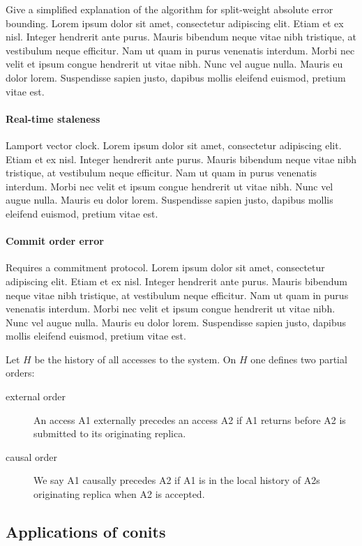 Give a simplified explanation of the algorithm for split-weight
absolute error bounding. Lorem ipsum dolor sit amet, consectetur
adipiscing elit. Etiam et ex nisl. Integer hendrerit ante
purus. Mauris bibendum neque vitae nibh tristique, at vestibulum neque
efficitur. Nam ut quam in purus venenatis interdum. Morbi nec velit et
ipsum congue hendrerit ut vitae nibh. Nunc vel augue nulla. Mauris eu
dolor lorem. Suspendisse sapien justo, dapibus mollis eleifend
euismod, pretium vitae est.

\paragraph{Real-time staleness}

Lamport vector clock. Lorem ipsum dolor sit amet, consectetur
adipiscing elit. Etiam et ex nisl. Integer hendrerit ante
purus. Mauris bibendum neque vitae nibh tristique, at vestibulum neque
efficitur. Nam ut quam in purus venenatis interdum. Morbi nec velit et
ipsum congue hendrerit ut vitae nibh. Nunc vel augue nulla. Mauris eu
dolor lorem. Suspendisse sapien justo, dapibus mollis eleifend
euismod, pretium vitae est.

\paragraph{Commit order error} Requires a commitment protocol. Lorem ipsum dolor sit amet,
consectetur adipiscing elit. Etiam et ex nisl. Integer hendrerit ante
purus. Mauris bibendum neque vitae nibh tristique, at vestibulum neque
efficitur. Nam ut quam in purus venenatis interdum. Morbi nec velit et
ipsum congue hendrerit ut vitae nibh. Nunc vel augue nulla. Mauris eu
dolor lorem. Suspendisse sapien justo, dapibus mollis eleifend
euismod, pretium vitae est.

Let $H$ be the history of all accesses to the system. On $H$ one
defines two partial orders:
\begin{description}
  \item[external order] An access A1 externally precedes an access A2 if A1 returns
  before A2 is submitted to its originating replica.
  \item[causal order] We say A1 causally precedes A2 if A1 is in the
    local history of A2s originating replica when A2 is accepted.
\end{description}

\subsection{Applications of conits}

